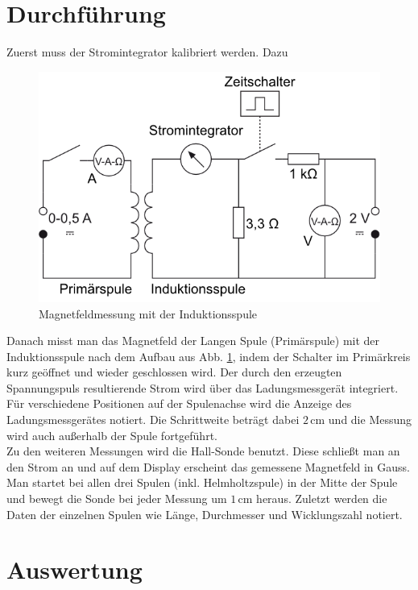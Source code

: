 \documentclass[12pt,a4paper,titlepage,headinclude,bibtotoc]{scrartcl}
\begin{document}
\section{Durchführung}
\label{sec:durchfuehrung}
Zuerst muss der Stromintegrator kalibriert werden.
Dazu \\
\begin{figure}[!htb]
	 \centering
	 \includegraphics[scale=1.0]{IndSpuleAufbau.png}
	\caption{Magnetfeldmessung mit der Induktionsspule \cite[Datum: 09.10.2014]{LP13}}	 
	 \label{fig:IndSpule}
\end{figure}
Danach misst man das Magnetfeld der Langen Spule (Primärspule) mit der Induktionsspule nach dem Aufbau aus Abb. \ref{fig:IndSpule}, indem der Schalter im Primärkreis kurz geöffnet und wieder geschlossen wird.
Der durch den erzeugten Spannungspuls resultierende Strom wird über das Ladungsmessgerät integriert.
Für verschiedene Positionen auf der Spulenachse wird die Anzeige des Ladungsmessgerätes notiert.
Die Schrittweite beträgt dabei $2\,$cm und die Messung wird auch außerhalb der Spule fortgeführt.\\
Zu den weiteren Messungen wird die Hall-Sonde benutzt.
Diese schließt man an den Strom an und auf dem Display erscheint das gemessene Magnetfeld in Gauss.
Man startet bei allen drei Spulen (inkl. Helmholtzspule) in der Mitte der Spule und bewegt die Sonde bei jeder Messung um $1\,$cm heraus.
Zuletzt werden die Daten der einzelnen Spulen wie Länge, Durchmesser und Wicklungszahl notiert.


\section{Auswertung}
\label{sec:auswertung}
\end{document}
